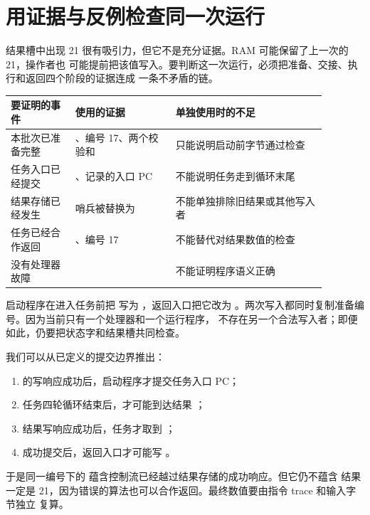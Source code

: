 \section{用证据与反例检查同一次运行}

结果槽中出现 21 很有吸引力，但它不是充分证据。RAM 可能保留了上一次的 21，操作者也
可能提前把该值写入。要判断这一次运行，必须把准备、交接、执行和返回四个阶段的证据连成
一条不矛盾的链。


\begin{longtable}{|L{0.18\linewidth}|L{0.28\linewidth}|L{0.42\linewidth}|}
\hline
{}
要证明的事件 & 使用的证据 & 单独使用时的不足 \\ \hline
本批次已准备完整 & 、编号 17、两个校验和 & 只能说明启动前字节通过检查 \\ \hline
任务入口已经提交 & 、记录的入口 PC & 不能说明任务走到循环末尾 \\ \hline
结果存储已经发生 & 哨兵被替换为  & 不能单独排除旧结果或其他写入者 \\ \hline
任务已经合作返回 & 、编号 17 & 不能替代对结果数值的检查 \\ \hline
没有处理器故障 &  & 不能证明程序语义正确 \\ \hline
\end{longtable}

启动程序在进入任务前把  写为 ，返回入口把它改为
。两次写入都同时复制准备编号。因为当前只有一个处理器和一个运行程序，
不存在另一个合法写入者；即便如此，仍要把状态字和结果槽共同检查。


我们可以从已定义的提交边界推出：

\begin{enumerate}
\item {} 的写响应成功后，启动程序才提交任务入口 PC；
\item 任务四轮循环结束后，才可能到达结果 ；
\item 结果写响应成功后，任务才取到 ；
\item {} 成功提交后，返回入口才可能写 。
\end{enumerate}

于是同一编号下的  蕴含控制流已经越过结果存储的成功响应。但它仍不蕴含
结果一定是 21，因为错误的算法也可以合作返回。最终数值要由指令 trace 和输入字节独立
复算。

